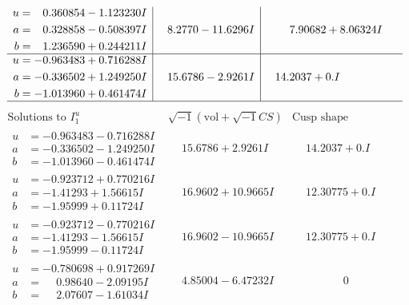 \documentclass[1p]{elsarticle_modified}
\theoremstyle{definition}
\newcommand{\I}{\sqrt{-1}}
\begin{document}
$$\begin{array}{c|c|c}
\begin{aligned}
u &= \phantom{-}0.360854 - 1.123230 I \\
a &= \phantom{-}0.328858 - 0.508397 I \\
b &= \phantom{-}1.236590 + 0.244211 I\end{aligned}
 & \phantom{-}8.2770 - 11.6296 I & \phantom{-}7.90682 + 8.06324 I \\ \hline\begin{aligned}
u &= -0.963483 + 0.716288 I \\
a &= -0.336502 + 1.249250 I \\
b &= -1.013960 + 0.461474 I\end{aligned}
 & \phantom{-}15.6786 - 2.9261 I & \phantom{-}14.2037 + 0. I\phantom{ +0.000000I}\\
 \hline 
 \end{array}$$\newpage$$\begin{array}{c|c|c}  
\text{Solutions to }I^u_{1}& \I (\text{vol} + \sqrt{-1}CS) & \text{Cusp shape}\\
 \hline 
\begin{aligned}
u &= -0.963483 - 0.716288 I \\
a &= -0.336502 - 1.249250 I \\
b &= -1.013960 - 0.461474 I\end{aligned}
 & \phantom{-}15.6786 + 2.9261 I & \phantom{-}14.2037 + 0. I\phantom{ +0.000000I} \\ \hline\begin{aligned}
u &= -0.923712 + 0.770216 I \\
a &= -1.41293 + 1.56615 I \\
b &= -1.95999 + 0.11724 I\end{aligned}
 & \phantom{-}16.9602 + 10.9665 I & \phantom{-}12.30775 + 0. I\phantom{ +0.000000I} \\ \hline\begin{aligned}
u &= -0.923712 - 0.770216 I \\
a &= -1.41293 - 1.56615 I \\
b &= -1.95999 - 0.11724 I\end{aligned}
 & \phantom{-}16.9602 - 10.9665 I & \phantom{-}12.30775 + 0. I\phantom{ +0.000000I} \\ \hline\begin{aligned}
u &= -0.780698 + 0.917269 I \\
a &= \phantom{-}0.98640 - 2.09195 I \\
b &= \phantom{-}2.07607 - 1.61034 I\end{aligned}
 & \phantom{-}4.85004 - 6.47232 I & \phantom{-0.000000 } 0 \\ \hline\begin{aligned}

\end{aligned}
\end{array}$$
\end{document}
